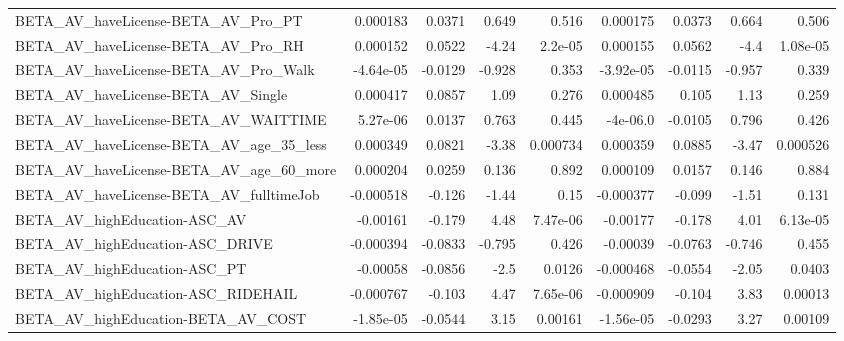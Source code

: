 \begin{tabular}{lrrrrrrrr}
BETA\_AV\_haveLicense-BETA\_AV\_Pro\_PT                 &    0.000183 &       0.0371 &    0.649 &    0.516 &   0.000175 &      0.0373 &        0.664 &         0.506 \\
BETA\_AV\_haveLicense-BETA\_AV\_Pro\_RH                 &    0.000152 &       0.0522 &    -4.24 &  2.2e-05 &   0.000155 &      0.0562 &         -4.4 &      1.08e-05 \\
BETA\_AV\_haveLicense-BETA\_AV\_Pro\_Walk               &   -4.64e-05 &      -0.0129 &   -0.928 &    0.353 &  -3.92e-05 &     -0.0115 &       -0.957 &         0.339 \\
BETA\_AV\_haveLicense-BETA\_AV\_Single                 &    0.000417 &       0.0857 &     1.09 &    0.276 &   0.000485 &       0.105 &         1.13 &         0.259 \\
BETA\_AV\_haveLicense-BETA\_AV\_WAITTIME               &    5.27e-06 &       0.0137 &    0.763 &    0.445 &   -4e-06.0 &     -0.0105 &        0.796 &         0.426 \\
BETA\_AV\_haveLicense-BETA\_AV\_age\_35\_less            &    0.000349 &       0.0821 &    -3.38 & 0.000734 &   0.000359 &      0.0885 &        -3.47 &      0.000526 \\
BETA\_AV\_haveLicense-BETA\_AV\_age\_60\_more            &    0.000204 &       0.0259 &    0.136 &    0.892 &   0.000109 &      0.0157 &        0.146 &         0.884 \\
BETA\_AV\_haveLicense-BETA\_AV\_fulltimeJob            &   -0.000518 &       -0.126 &    -1.44 &     0.15 &  -0.000377 &      -0.099 &        -1.51 &         0.131 \\
BETA\_AV\_highEducation-ASC\_AV                       &    -0.00161 &       -0.179 &     4.48 & 7.47e-06 &   -0.00177 &      -0.178 &         4.01 &      6.13e-05 \\
BETA\_AV\_highEducation-ASC\_DRIVE                    &   -0.000394 &      -0.0833 &   -0.795 &    0.426 &   -0.00039 &     -0.0763 &       -0.746 &         0.455 \\
BETA\_AV\_highEducation-ASC\_PT                       &    -0.00058 &      -0.0856 &     -2.5 &   0.0126 &  -0.000468 &     -0.0554 &        -2.05 &        0.0403 \\
BETA\_AV\_highEducation-ASC\_RIDEHAIL                 &   -0.000767 &       -0.103 &     4.47 & 7.65e-06 &  -0.000909 &      -0.104 &         3.83 &       0.00013 \\
BETA\_AV\_highEducation-BETA\_AV\_COST                 &   -1.85e-05 &      -0.0544 &     3.15 &  0.00161 &  -1.56e-05 &     -0.0293 &         3.27 &       0.00109 \\

\end{tabular}
